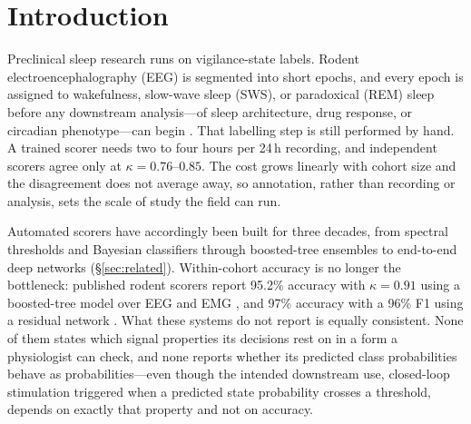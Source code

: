 
\section{Introduction}

Preclinical sleep research runs on vigilance-state labels. Rodent electroencephalography (EEG) is segmented into short epochs, and every epoch is assigned to wakefulness, slow-wave sleep (SWS), or paradoxical (REM) sleep before any downstream analysis---of sleep architecture, drug response, or circadian phenotype---can begin \citep{rechtschaffen2002sleep}. That labelling step is still performed by hand. A trained scorer needs two to four hours per 24\,h recording, and independent scorers agree only at $\kappa = 0.76$--$0.85$. The cost grows linearly with cohort size and the disagreement does not average away, so annotation, rather than recording or analysis, sets the scale of study the field can run.

Automated scorers have accordingly been built for three decades, from spectral thresholds and Bayesian classifiers through boosted-tree ensembles to end-to-end deep networks (\S\ref{sec:related}). Within-cohort accuracy is no longer the bottleneck: published rodent scorers report 95.2\% accuracy with $\kappa = 0.91$ using a boosted-tree model over EEG and EMG \citep{wang2023_intellisleepscorer}, and 97\% accuracy with a 96\% F1 using a residual network \citep{jha2024_slumbernet}. What these systems do not report is equally consistent. None of them states which signal properties its decisions rest on in a form a physiologist can check, and none reports whether its predicted class probabilities behave as probabilities---even though the intended downstream use, closed-loop stimulation triggered when a predicted state probability crosses a threshold, depends on exactly that property and not on accuracy.

